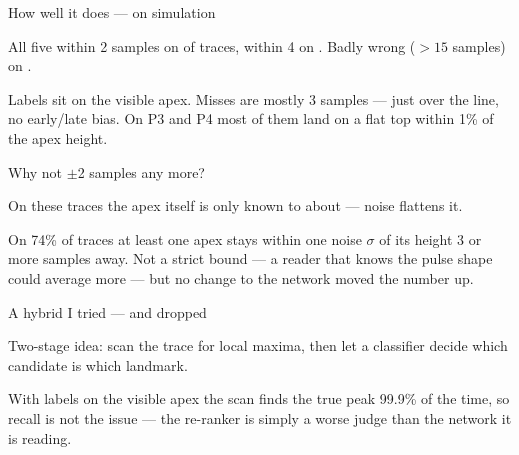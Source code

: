 \begin{frame}{How well it does --- on simulation}
  \vspace{0pt}\par
  {\small All five within 2 samples on  of traces, within 4 on
   . Badly wrong ($>15$ samples) on .}
  \par\vspace{2pt}
  \par\vspace{-4pt}
  {\tiny\color{lightgrey} Labels sit on the visible apex. Misses are mostly 3 samples --- just
   over the line, no early/late bias. On P3 and P4 most of them land on a flat top within
   1\% of the apex height.}
\end{frame}

\begin{frame}{Why not $\pm$2 samples any more?}
  \vspace{0pt}\par
  {\small On these traces the apex itself is only known to about
    --- noise flattens it.}
  \par\vspace{2pt}
  \par\vspace{-4pt}
  {\tiny\color{lightgrey} On 74\% of traces at least one apex stays within one noise $\sigma$ of
   its height 3 or more samples away. Not a strict bound --- a reader that knows the pulse
   shape could average more --- but no change to the network moved the number up.}
\end{frame}

\begin{frame}{A hybrid I tried --- and dropped}
  \vspace{0pt}\par
  {\small Two-stage idea: scan the trace for local maxima, then let a classifier
   decide which candidate is which landmark.}
  \par\vspace{2pt}
  \par\vspace{-4pt}
  {\tiny\color{lightgrey} With labels on the visible apex the scan finds the true peak 99.9\%
   of the time, so recall is not the issue --- the re-ranker is simply a worse judge than
   the network it is reading.}
\end{frame}

